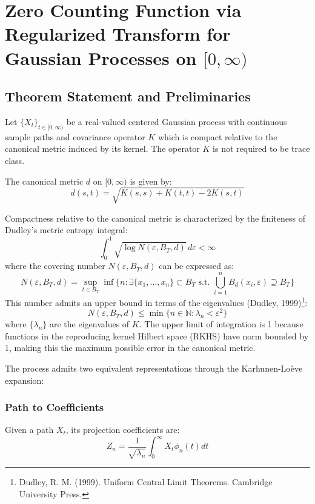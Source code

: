 \documentclass{article}
\begin{document}
\section{Zero Counting Function via Regularized Transform for Gaussian Processes on $[0,\infty)$}

\subsection{Theorem Statement and Preliminaries}
Let $\{X_t\}_{t\in[0,\infty)}$ be a real-valued centered Gaussian process with continuous sample paths and covariance operator $K$ which is compact relative to the canonical metric induced by its kernel. The operator $K$ is not required to be trace class. 

The canonical metric $d$ on $[0,\infty)$ is given by: \begin{equation} d(s,t) = \sqrt{K(s,s) + K(t,t) - 2K(s,t)} \end{equation}

Compactness relative to the canonical metric is characterized by the finiteness of Dudley's metric entropy integral:
\begin{equation}
    \int_0^1 \sqrt{\log N(\varepsilon,B_T,d)} \, d\varepsilon < \infty
\end{equation}
where the covering number $N(\varepsilon,B_T,d)$ can be expressed as:
\begin{equation}
    N(\varepsilon,B_T,d) = \sup_{t \in B_T} \inf\{n : \exists \{x_1,\ldots,x_n\} \subset B_T \text{ s.t. } \bigcup_{i=1}^n B_d(x_i,\varepsilon) \supseteq B_T\}
\end{equation}
This number admits an upper bound in terms of the eigenvalues (Dudley, 1999)\footnote{Dudley, R. M. (1999). Uniform Central Limit Theorems. Cambridge University Press.}:
\begin{equation}
    N(\varepsilon,B_T,d) \leq \min\{n \in \mathbb{N} : \lambda_n < \varepsilon^2\}
\end{equation}
where $\{\lambda_n\}$ are the eigenvalues of $K$. The upper limit of integration is 1 because functions in the reproducing kernel Hilbert space (RKHS) have norm bounded by 1, making this the maximum possible error in the canonical metric.

The process admits two equivalent representations through the Karhunen-Loève expansion:

\subsubsection*{Path to Coefficients}
Given a path $X_t$, its projection coefficients are:
\begin{equation}
    Z_n = \frac{1}{\sqrt{\lambda_n}} \int_0^\infty X_t \phi_n(t) dt
\end{equation}
\end{document}
